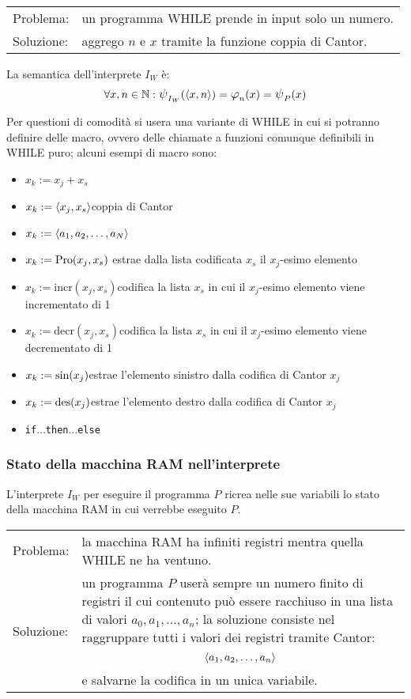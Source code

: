 \begin{tabular}{l p{}}
    Problema:& un programma WHILE prende in input solo un numero.\\[.5em]
    Soluzione:& aggrego $n$ e $x$ tramite la funzione coppia di Cantor.
\end{tabular}
\begin{figure}[h]
    \centering
    
\end{figure}

La semantica dell'interprete $I_W$ è:
$$\forall x,n\in\N: \semanticaWHILE_{I_W}(\cantor{x,n})
=\semanticaRAM_n(x)=\semanticaWHILE_P(x)$$

Per questioni di comodità si usera una variante di WHILE in cui si potranno definire
delle macro, ovvero delle chiamate a funzioni comunque definibili in WHILE puro; alcuni
esempi di macro sono:
\begin{itemize}
    \item $x_k:=x_j+x_s$
    \item $x_k:=\langle x_j,x_s\rangle$\hfill coppia di Cantor
    \item $x_k:=\langle a_1,a_2,\dots,a_N\rangle$\hfill {}
    \item $x_k:=\text{Pro}(x_j,x_s)$ \hfill estrae dalla lista codificata $x_s$ il
        $x_j$-esimo elemento
    \item $x_k:=\text{incr}(x_j,x_s)$\hfill codifica la lista $x_s$ in cui il $x_j$-esimo elemento
        viene incrementato di 1
    \item $x_k:=\text{decr}(x_j,x_s)$\hfill codifica la lista $x_s$ in cui il $x_j$-esimo elemento
    viene decrementato di 1
    \item $x_k:=\text{sin}(x_j)$\hfill estrae l'elemento sinistro dalla codifica di Cantor $x_j$
    \item $x_k:=\text{des}(x_j)$\hfill estrae l'elemento destro dalla codifica di Cantor $x_j$
    \item \texttt{if}$\dots$\texttt{then}$\dots$\texttt{else}
\end{itemize}

\subsubsection*{Stato della macchina RAM nell'interprete}
L'interprete $I_W$ per eseguire il programma $P$ ricrea nelle sue variabili lo stato
della macchina RAM in cui verrebbe eseguito $P$.

\begin{tabular}{l p{}}
    Problema:& la macchina RAM ha infiniti registri mentra quella WHILE ne ha ventuno.
        \\[.5em]
    Soluzione:& un programma $P$ userà sempre un numero finito di registri il cui contenuto
        può essere racchiuso in una lista di valori $a_0,a_1,\dots,a_n$; la soluzione
        consiste nel raggruppare tutti i valori dei registri tramite Cantor:
        $$ \langle a_1,a_2,\dots,a_n\rangle $$ e salvarne la codifica in un unica variabile.
\end{tabular}

